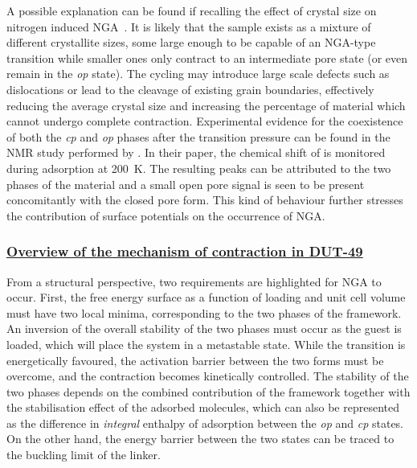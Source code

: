 A possible explanation can be found if recalling the effect 
of crystal size on nitrogen induced 
\gls{NGA}~\cite{krauseEffectCrystalliteSize2018}. It is likely 
that the sample exists as a mixture of different crystallite
sizes, some large enough to be capable of an \gls{NGA}-type transition 
while smaller ones only contract to an intermediate pore state
(or even remain in the \textit{op} state).
The cycling may introduce large scale defects such as dislocations
or lead to the cleavage of existing grain boundaries, 
effectively reducing the average crystal size
and increasing the percentage of material which cannot undergo 
complete contraction.
Experimental evidence for the coexistence of both the \textit{cp} and 
\textit{op} phases after the transition pressure can be found in the 
 \gls{NMR} study performed 
by \citet{schaberSituMonitoringUnique2017}. In their paper,
the chemical shift of  is monitored during
adsorption at \SI{200}{\kelvin}. The resulting peaks can be attributed
to the two phases of the material and a small
open pore signal is seen to be present concomitantly with the 
closed pore form.
This kind of behaviour further stresses the 
contribution of surface potentials on the occurrence of \gls{NGA}.

\subsubsection{\underline{Overview of the mechanism of contraction in DUT-49}}

From a structural perspective, two requirements are 
highlighted for \gls{NGA} to occur.
First, the free energy surface as a function of loading and 
unit cell volume must have two local minima, corresponding to the 
two phases of the framework. An inversion of the overall stability
of the two phases must occur as the guest is loaded, which will 
place the system in a metastable state. While the transition
is energetically favoured, the activation barrier between the 
two forms must be overcome, and the contraction becomes 
kinetically controlled. The stability of the two phases 
depends on the combined contribution of the framework together
with the stabilisation effect of the adsorbed molecules,
which can also be represented as the
difference in \textit{integral} enthalpy of adsorption between the 
\textit{op} and \textit{cp} states. On the other hand, the 
energy barrier between the two states can be traced to the 
buckling limit of the linker.
